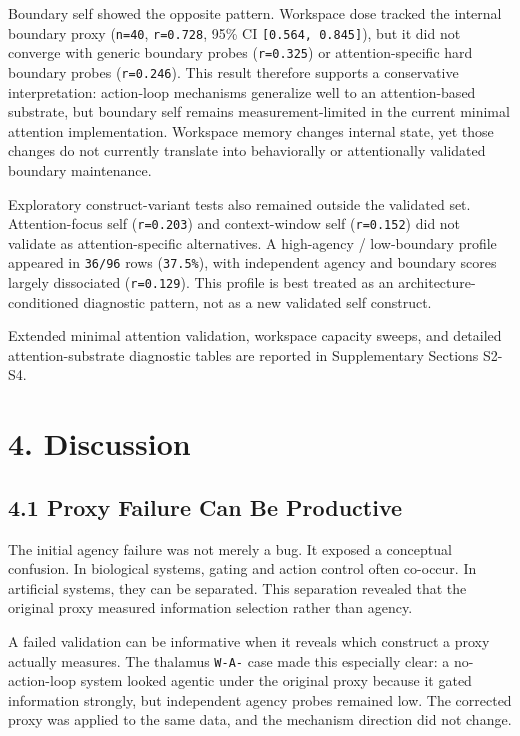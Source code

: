 \documentclass[
  11pt,
  letterpaper,
]{article}
\begin{document}
Boundary self showed the opposite pattern. Workspace dose tracked the
internal boundary proxy (\texttt{n=40}, \texttt{r=0.728}, 95\% CI
\texttt{{[}0.564,\ 0.845{]}}), but it did not converge with generic
boundary probes (\texttt{r=0.325}) or attention-specific hard boundary
probes (\texttt{r=0.246}). This result therefore supports a conservative
interpretation: action-loop mechanisms generalize well to an
attention-based substrate, but boundary self remains measurement-limited
in the current minimal attention implementation. Workspace memory
changes internal state, yet those changes do not currently translate
into behaviorally or attentionally validated boundary maintenance.

Exploratory construct-variant tests also remained outside the validated
set. Attention-focus self (\texttt{r=0.203}) and context-window self
(\texttt{r=0.152}) did not validate as attention-specific alternatives.
A high-agency / low-boundary profile appeared in \texttt{36/96} rows
(\texttt{37.5\%}), with independent agency and boundary scores largely
dissociated (\texttt{r=0.129}). This profile is best treated as an
architecture-conditioned diagnostic pattern, not as a new validated self
construct.

Extended minimal attention validation, workspace capacity sweeps, and
detailed attention-substrate diagnostic tables are reported in
Supplementary Sections S2-S4.

\section{4. Discussion}\label{discussion}

\subsection{4.1 Proxy Failure Can Be
Productive}\label{proxy-failure-can-be-productive}

The initial agency failure was not merely a bug. It exposed a conceptual
confusion. In biological systems, gating and action control often
co-occur. In artificial systems, they can be separated. This separation
revealed that the original proxy measured information selection rather
than agency.

A failed validation can be informative when it reveals which construct a
proxy actually measures. The thalamus \texttt{W-A-} case made this
especially clear: a no-action-loop system looked agentic under the
original proxy because it gated information strongly, but independent
agency probes remained low. The corrected proxy was applied to the same
data, and the mechanism direction did not change.
\end{document}
